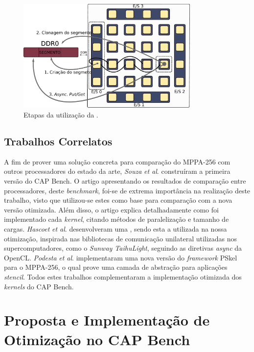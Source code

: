 \documentclass[a4paper,11pt]{article}
\newcommand{\etal}{\textit{et al}.\xspace}
\newcommand{\mppa}{MPPA-256\xspace}
\newcommand{\capb}{CAP Bench\xspace}
\begin{document}
\begin{figure}[H]
\centering
\includegraphics[width=9cm, keepaspectratio]{figs/putget.pdf}
\caption{Etapas da utilização da \api \async.}\par
\label{fig:asyncOverview}
\end{figure}


\subsection{Trabalhos Correlatos}

A fim de prover uma solução concreta para comparação do \mppa com outros processadores do estado da arte, \textit{Souza} \etal construíram a primeira versão do \capb \cite{Castro-Souza-CCPE:2016}. O artigo apresentando os resultados de comparação entre processadores, deste \textit{benchmark}, foi-se de extrema importância na realização deste trabalho, visto que utilizou-se estes como base para comparação com a nova versão otimizada. Além disso, o artigo explica detalhadamente como foi implementado cada \textit{kernel}, citando métodos de paralelização e tamanho de cargas. \textit{Hascoet} \etal \cite{Hascoet2017} desenvolveram uma \api, sendo esta a utilizada na nossa otimização, inspirada nas bibliotecas de comunicação unilateral utilizadas nos supercomputadores, como o \textit{Sunway TaihuLight}, seguindo as diretivas \textit{async} da OpenCL. \textit{Podesta} \etal \cite{Podesta2018} implementaram uma nova versão do \textit{framework} PSkel para o \mppa, o qual prove uma camada de abstração para aplicações \textit{stencil}. Todos estes trabalhos complementaram a implementação otimizada dos \textit{kernels} do \capb.

\section{Proposta e Implementação de Otimização no \capb}
\label{sec:capbMPPA}
\end{document}
